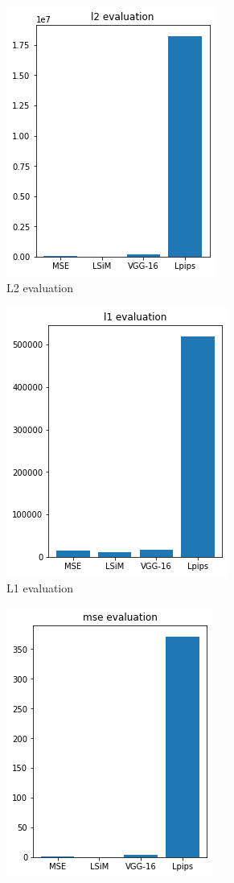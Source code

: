 \documentclass[a4paper,12pt,twoside]{report}
\begin{document}
\begin{figure}
	\centering
	\begin{subfigure}{0.32\textwidth}
		\centering
		\includegraphics[scale=0.48]{superresolution/karman_eval_l2.png}
		\caption{L2 evaluation}
	\end{subfigure}
	\begin{subfigure}{0.32\textwidth}
		\centering
		\includegraphics[scale=0.48]{superresolution/karman_eval_l1.png}
		\caption{L1 evaluation}
	\end{subfigure}
	\begin{subfigure}{0.32\textwidth}
		\centering
		\includegraphics[scale=0.48]{superresolution/karman_eval_mse.png}

\end{subfigure}
\end{figure}
\end{document}
